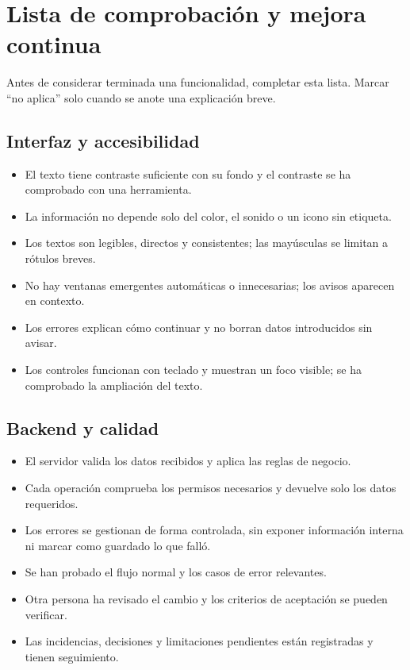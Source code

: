 \section{Lista de comprobación y mejora continua}

Antes de considerar terminada una funcionalidad, completar esta lista. Marcar ``no aplica'' solo cuando se anote una explicación breve.

\subsection{Interfaz y accesibilidad}
\begin{itemize}[leftmargin=*]
  \item El texto tiene contraste suficiente con su fondo y el contraste se ha comprobado con una herramienta.
  \item La información no depende solo del color, el sonido o un icono sin etiqueta.
  \item Los textos son legibles, directos y consistentes; las mayúsculas se limitan a rótulos breves.
  \item No hay ventanas emergentes automáticas o innecesarias; los avisos aparecen en contexto.
  \item Los errores explican cómo continuar y no borran datos introducidos sin avisar.
  \item Los controles funcionan con teclado y muestran un foco visible; se ha comprobado la ampliación del texto.
\end{itemize}

\subsection{Backend y calidad}
\begin{itemize}[leftmargin=*]
  \item El servidor valida los datos recibidos y aplica las reglas de negocio.
  \item Cada operación comprueba los permisos necesarios y devuelve solo los datos requeridos.
  \item Los errores se gestionan de forma controlada, sin exponer información interna ni marcar como guardado lo que falló.
  \item Se han probado el flujo normal y los casos de error relevantes.
  \item Otra persona ha revisado el cambio y los criterios de aceptación se pueden verificar.
  \item Las incidencias, decisiones y limitaciones pendientes están registradas y tienen seguimiento.
\end{itemize}

